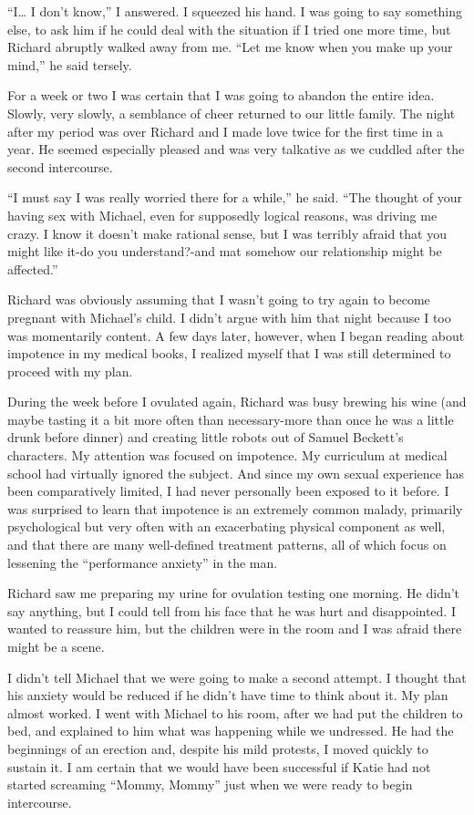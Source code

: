 \documentclass[]{article}
\begin{document}
“I… I don’t know,” I answered.  I squeezed his hand.  I was going to say something else, to ask him if he could deal with the situation if I tried one more time, but Richard abruptly walked away from me.  “Let me know when you make up your mind,” he said tersely.

For a week or two I was certain that I was going to abandon the entire idea.  Slowly, very slowly, a semblance of cheer returned to our little family.  The night after my period was over Richard and I made love twice for the first time in a year.  He seemed especially pleased and was very talkative as we cuddled after the second intercourse.

“I must say I was really worried there for a while,” he said.  “The thought of your having sex with Michael, even for supposedly logical reasons, was driving me crazy.  I know it doesn’t make rational sense, but I was terribly afraid that you might like it-do you understand?-and mat somehow our relationship might be affected.”

Richard was obviously assuming that I wasn’t going to try again to become pregnant with Michael’s child.  I didn’t argue with him that night because I too was momentarily content.  A few days later, however, when I began reading about impotence in my medical books, I realized myself that I was still determined to proceed with my plan.

During the week before I ovulated again, Richard was busy brewing his wine (and maybe tasting it a bit more often than necessary-more than once he was a little drunk before dinner) and creating little robots out of Samuel Beckett’s characters.  My attention was focused on impotence.  My curriculum at medical school had virtually ignored the subject.  And since my own sexual experience has been comparatively limited, I had never personally been exposed to it before.  I was surprised to learn that impotence is an extremely common malady, primarily psychological but very often with an exacerbating physical component as well, and that there are many well-defined treatment patterns, all of which focus on lessening the “performance anxiety” in the man.

Richard saw me preparing my urine for ovulation testing one morning.  He didn’t say anything, but I could tell from his face that he was hurt and disappointed.  I wanted to reassure him, but the children were in the room and I was afraid there might be a scene.

I didn’t tell Michael that we were going to make a second attempt.  I thought that his anxiety would be reduced if he didn’t have time to think about it.  My plan almost worked.  I went with Michael to his room, after we had put the children to bed, and explained to him what was happening while we undressed.  He had the beginnings of an erection and, despite his mild protests, I moved quickly to sustain it.  I am certain that we would have been successful if Katie had not started screaming “Mommy, Mommy” just when we were ready to begin intercourse.
\end{document}
